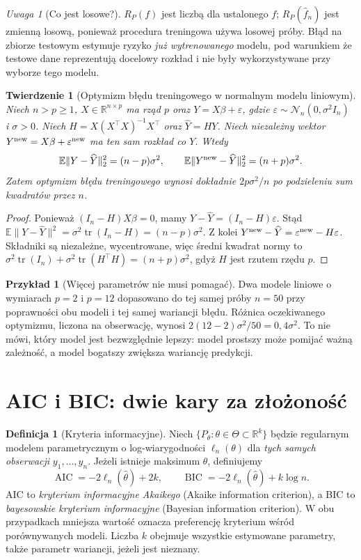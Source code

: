 \documentclass[11pt,a4paper,oneside]{report}
\numberwithin{equation}{chapter}
\theoremstyle{plain}
\newtheorem{twierdzenie}{Twierdzenie}[chapter]
\theoremstyle{definition}
\newtheorem{definicja}{Definicja}[chapter]
\newtheorem{przyklad}{Przykład}[chapter]
\theoremstyle{remark}
\newtheorem{uwaga}{Uwaga}[chapter]
\newcommand{\R}{\mathbb R}
\newcommand{\E}{\mathbb E}
\begin{document}
\begin{uwaga}[Co jest losowe?]
$R_P(f)$ jest liczbą dla ustalonego $f$; $R_P(\widehat f_n)$ jest
zmienną losową, ponieważ procedura treningowa używa losowej próby.
Błąd na zbiorze testowym estymuje ryzyko \emph{już wytrenowanego}
modelu, pod warunkiem że testowe dane reprezentują docelowy rozkład
i nie były wykorzystywane przy wyborze tego modelu.
\end{uwaga}

\begin{twierdzenie}[Optymizm błędu treningowego w normalnym modelu liniowym]
\label{thm:training-optimism}
Niech $n>p\ge1$, $X\in\R^{n\times p}$ ma rząd $p$ oraz
$Y=X\beta+\varepsilon$, gdzie
$\varepsilon\sim\mathcal N_n(0,\sigma^2I_n)$ i $\sigma>0$.
Niech $H=X(X^\top X)^{-1}X^\top$ oraz $\widehat Y=HY$.
Niech niezależny wektor $Y^{\rm new}=X\beta+\varepsilon^{\rm new}$
ma ten sam rozkład co $Y$. Wtedy
\[
 \E\|Y-\widehat Y\|_2^2=(n-p)\sigma^2,
 \qquad
 \E\|Y^{\rm new}-\widehat Y\|_2^2=(n+p)\sigma^2.
\]
Zatem optymizm błędu treningowego wynosi dokładnie
$2p\sigma^2/n$ po podzieleniu sum kwadratów przez $n$.
\end{twierdzenie}
\begin{proof}
Ponieważ $(I_n-H)X\beta=0$, mamy
$Y-\widehat Y=(I_n-H)\varepsilon$. Stąd
$\E\|Y-\widehat Y\|^2=\sigma^2\operatorname{tr}(I_n-H)
=(n-p)\sigma^2$.
Z kolei $Y^{\rm new}-\widehat Y=\varepsilon^{\rm new}-H\varepsilon$.
Składniki są niezależne, wycentrowane, więc średni kwadrat normy to
$\sigma^2\operatorname{tr}(I_n)+\sigma^2\operatorname{tr}(H^\top H)
=(n+p)\sigma^2$, gdyż $H$ jest rzutem rzędu $p$.
\end{proof}

\begin{przyklad}[Więcej parametrów nie musi pomagać]
Dwa modele liniowe o wymiarach $p=2$ i $p=12$ dopasowano do tej samej
próby $n=50$ przy poprawności obu modeli i tej samej wariancji błędu.
Różnica oczekiwanego optymizmu, liczona na obserwację, wynosi
$2(12-2)\sigma^2/50=0{,}4\sigma^2$. To nie mówi, który model
jest bezwzględnie lepszy: model prostszy może pomijać ważną
zależność, a model bogatszy zwiększa wariancję predykcji.
\end{przyklad}

\section{AIC i BIC: dwie kary za złożoność}
\begin{definicja}[Kryteria informacyjne]
Niech $\{P_\theta:\theta\in\Theta\subset\R^k\}$ będzie
regularnym modelem parametrycznym o log-wiarygodności $\ell_n(\theta)$
dla \emph{tych samych obserwacji} $y_1,\ldots,y_n$.
Jeżeli istnieje maksimum $\widehat\theta$, definiujemy
\[
 \operatorname{AIC}=-2\ell_n(\widehat\theta)+2k,
 \qquad
 \operatorname{BIC}=-2\ell_n(\widehat\theta)+k\log n.
\]
AIC to \emph{kryterium informacyjne Akaikego} (Akaike information
criterion), a BIC to \emph{bayesowskie kryterium informacyjne}
(Bayesian information criterion). W obu przypadkach mniejsza
wartość oznacza preferencję kryterium wśród porównywanych modeli.
Liczba $k$ obejmuje wszystkie
estymowane parametry, także parametr wariancji, jeżeli jest nieznany.
\end{definicja}
\end{document}
